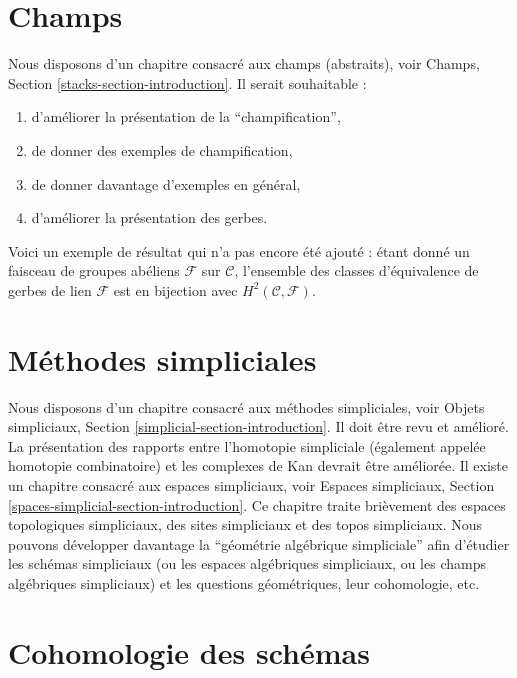 \section{Champs}
\label{section-stacks}

\noindent
Nous disposons d'un chapitre consacré aux champs (abstraits), voir
Champs, Section \ref{stacks-section-introduction}.
Il serait souhaitable :
\begin{enumerate}
\item d'améliorer la présentation de la ``champification'',
\item de donner des exemples de champification,
\item de donner davantage d'exemples en général,
\item d'améliorer la présentation des gerbes.
\end{enumerate}
Voici un exemple de résultat qui n'a pas encore été ajouté : étant donné un faisceau de groupes
abéliens $\mathcal{F}$
sur $\mathcal{C}$, l'ensemble des classes d'équivalence de gerbes de lien
$\mathcal{F}$ est en bijection avec $H^2(\mathcal{C}, \mathcal{F})$.


\section{Méthodes simpliciales}
\label{section-simplicial}

\noindent
Nous disposons d'un chapitre consacré aux méthodes simpliciales, voir
Objets simpliciaux, Section \ref{simplicial-section-introduction}.
Il doit être revu et amélioré. La présentation des
rapports entre l'homotopie simpliciale (également appelée
homotopie combinatoire) et les complexes de Kan devrait être améliorée.
Il existe un chapitre consacré aux espaces simpliciaux, voir
Espaces simpliciaux, Section \ref{spaces-simplicial-section-introduction}.
Ce chapitre traite brièvement des
espaces topologiques simpliciaux, des sites simpliciaux et des topos simpliciaux.
Nous pouvons développer davantage la ``géométrie algébrique simpliciale'' afin d'étudier
les schémas simpliciaux (ou les espaces algébriques simpliciaux, ou
les champs algébriques simpliciaux) et les questions géométriques, leur cohomologie,
etc.


\section{Cohomologie des schémas}
\label{section-schemes-cohomology}

